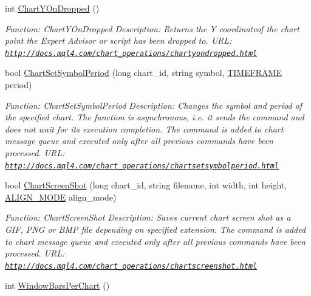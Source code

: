 \begin{DoxyCompactItemize}
int \hyperlink{class_m_q_l4_c_sharp_1_1_base_1_1_m_q_l_base_a7d525c390d3311cd388dc85a791835ff}{Chart\+Y\+On\+Dropped} ()
\begin{DoxyCompactList}\small\item\em Function\+: Chart\+Y\+On\+Dropped Description\+: Returns the Y coordinateof the chart point the Expert Advisor or script has been dropped to. U\+RL\+: \href{http://docs.mql4.com/chart_operations/chartyondropped.html}{\tt http\+://docs.\+mql4.\+com/chart\+\_\+operations/chartyondropped.\+html} \end{DoxyCompactList}\item 
bool \hyperlink{class_m_q_l4_c_sharp_1_1_base_1_1_m_q_l_base_a72976bf32c91ef137bc48254198b065b}{Chart\+Set\+Symbol\+Period} (long chart\+\_\+id, string symbol, \hyperlink{namespace_m_q_l4_c_sharp_1_1_base_1_1_enums_a838810aaa87c63c12737408dba8c0b35}{T\+I\+M\+E\+F\+R\+A\+ME} period)
\begin{DoxyCompactList}\small\item\em Function\+: Chart\+Set\+Symbol\+Period Description\+: Changes the symbol and period of the specified chart. The function is asynchronous, i.\+e. it sends the command and does not wait for its execution completion. The command is added to chart message queue and executed only after all previous commands have been processed. U\+RL\+: \href{http://docs.mql4.com/chart_operations/chartsetsymbolperiod.html}{\tt http\+://docs.\+mql4.\+com/chart\+\_\+operations/chartsetsymbolperiod.\+html} \end{DoxyCompactList}\item 
bool \hyperlink{class_m_q_l4_c_sharp_1_1_base_1_1_m_q_l_base_a09daeb6264fd9ad808e32b653e172bcc}{Chart\+Screen\+Shot} (long chart\+\_\+id, string filename, int width, int height, \hyperlink{namespace_m_q_l4_c_sharp_1_1_base_1_1_enums_a39e4f20c4e2a3e92e3571279c771960c}{A\+L\+I\+G\+N\+\_\+\+M\+O\+DE} align\+\_\+mode)
\begin{DoxyCompactList}\small\item\em Function\+: Chart\+Screen\+Shot Description\+: Saves current chart screen shot as a G\+IF, P\+NG or B\+MP file depending on specified extension. The command is added to chart message queue and executed only after all previous commands have been processed. U\+RL\+: \href{http://docs.mql4.com/chart_operations/chartscreenshot.html}{\tt http\+://docs.\+mql4.\+com/chart\+\_\+operations/chartscreenshot.\+html} \end{DoxyCompactList}\item 
int \hyperlink{class_m_q_l4_c_sharp_1_1_base_1_1_m_q_l_base_a24f8ac19e1722104025e23d2910fcb4d}{Window\+Bars\+Per\+Chart} ()

\end{DoxyCompactItemize}
